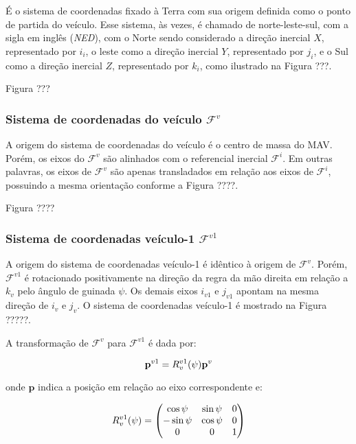 \documentclass[a4paper, 12pt]{article}
\begin{document}
É o sistema de coordenadas fixado à Terra com sua origem definida como o ponto de partida do veículo. Esse sistema, às vezes, é chamado de norte-leste-sul, com a sigla em inglês (\textit{NED}), com o Norte sendo considerado a direção inercial $X$, representado por $i_i$, o leste como a direção inercial $Y$, representado por $j_i$, e o Sul como a direção inercial $Z$, representado por $k_i$, como ilustrado na Figura ???. 

Figura ???

\subsubsection{Sistema de coordenadas do veículo $\mathcal{F}^v$}

A origem do sistema de coordenadas do veículo é o centro de massa do MAV. Porém, os eixos do $\mathcal{F}^v$ são alinhados com o referencial inercial $\mathcal{F}^i$. Em outras palavras, os eixos de $\mathcal{F}^v$ são apenas transladados em relação aos eixos de $\mathcal{F}^i$, possuindo a mesma orientação conforme a Figura ????.

Figura ????

\subsubsection{Sistema de coordenadas veículo-1 $\mathcal{F}^{v1}$}

A origem do sistema de coordenadas veículo-1 é idêntico à origem de $\mathcal{F}^v$. Porém, $\mathcal{F}^{v1}$ é rotacionado positivamente na direção da regra da mão direita em relação a $k_v$ pelo ângulo de guinada $\psi$. Os demais eixos $i_{v1}$ e $j_{v1}$ apontam na mesma direção de $i_v$ e $j_v$. O sistema de coordenadas veículo-1 é mostrado na Figura ?????. 

A transformação de $\mathcal{F}^{v}$ para $\mathcal{F}^{v1}$ é dada por:

\begin{equation}
\centering
\mathbf{p}^{v1} = { R }_{ v }^{ v1 }(\psi)\mathbf{p}^{v}
\label{eq:coord1}
\end{equation}

\noindent onde $\mathbf{p}$ indica a posição em relação ao eixo correspondente e: 

\begin{equation}
\centering
{ R }_{ v }^{ v1 }(\psi) = 
\begin{pmatrix} 
\cos { \psi  }  & \sin { \psi  } & 0 \\ -\sin { \psi  }  & \cos { \psi  } & 0  \\ 0  & 0 & 1 
\end{pmatrix}
\label{eq:rotguinada}
\end{equation}
\end{document}
